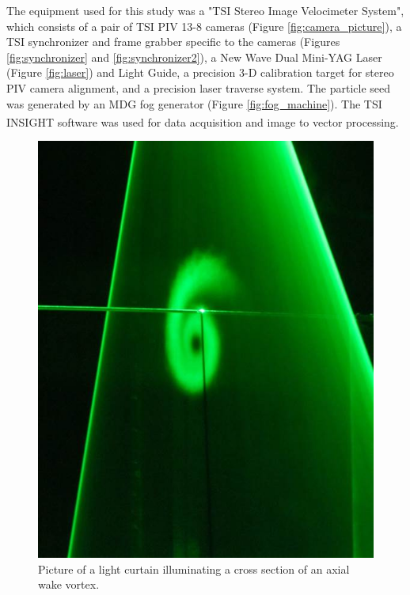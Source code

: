 The equipment used for this study was a "TSI Stereo Image Velocimeter System", 
which consists of a pair of TSI PIV 13-8 cameras (Figure 
\ref{fig:camera_picture}), a TSI synchronizer and frame 
grabber specific to the cameras (Figures \ref{fig:synchronizer} and 
\ref{fig:synchronizer2}), a New Wave Dual Mini-YAG Laser (Figure 
\ref{fig:laser}) and Light Guide, a precision 3-D calibration target for stereo 
PIV camera alignment, and a precision laser traverse system. The particle seed 
was generated by an MDG fog generator (Figure \ref{fig:fog_machine}). The TSI 
INSIGHT\textsuperscript{\textcopyright} software was used 
for data acquisition and image to vector processing.

\begin{figure}[H]
	\centering
	\includegraphics[width=5in]{figs/piv_method/laser_sheet_picture}
	\caption{Picture of a light curtain illuminating a cross section of an 
	axial wake vortex.}
	\label{fig:laser_sheet_picture}
\end{figure}

